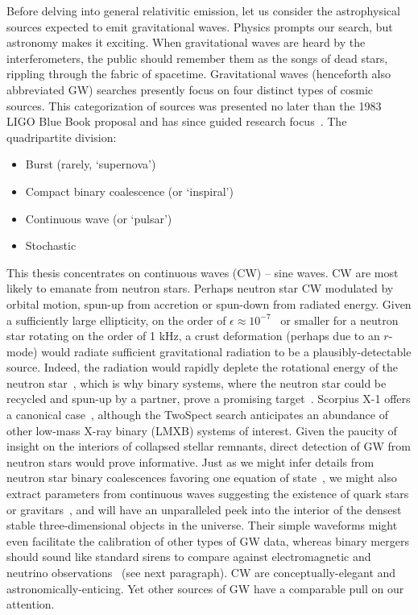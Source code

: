 Before delving into general relativitic emission, let us consider the astrophysical sources expected to emit gravitational waves. 
Physics prompts our search, but astronomy makes it exciting.
When gravitational waves are heard by the interferometers, the public should remember them as the songs of dead stars, rippling through the fabric of spacetime.  
Gravitational waves (henceforth also abbreviated GW) searches presently focus on four distinct types of cosmic sources.
This categorization of sources was presented no later than the 1983 LIGO Blue Book proposal and has since guided research focus~\cite{CollinsGravityShadow,Schutz1989}. 
The quadripartite division:
\begin{itemize}
\item Burst (rarely, `supernova')
\item Compact binary coalescence (or `inspiral')
\item Continuous wave (or `pulsar')
\item Stochastic
\end{itemize}

This thesis concentrates on continuous waves (CW) -- sine waves. 
CW are most likely to emanate from neutron stars. 
Perhaps neutron star CW modulated by orbital motion, spun-up from accretion or spun-down from radiated energy. 
Given a sufficiently large ellipticity, on the order of $\epsilon \approx 10^{-7}$~\cite{Owen2005} or smaller for a neutron star rotating on the order of 1 kHz, a crust deformation (perhaps due to an $r$-mode) would radiate sufficient gravitational radiation to be a plausibly-detectable source. 
Indeed, the radiation would rapidly deplete the rotational energy of the neutron star~\cite{Owen1998}, which is why binary systems, where the neutron star could be recycled and spun-up by a partner, prove a promising target~\cite{PapaloizouPringle1978,Wagoner1984}. 
Scorpius X-1 offers a canonical case~\cite{AbbottScoX12007}, although the TwoSpect search anticipates an abundance of other low-mass X-ray binary (LMXB) systems of interest. 
Given the paucity of insight on the interiors of collapsed stellar remnants, direct detection of GW from neutron stars would prove informative. 
Just as we might infer details from neutron star binary coalescences favoring one equation of state~\cite{Lattimer2007,Read2009}, we might also extract parameters from continuous waves suggesting the existence of quark stars or gravitars~\cite{Owen2005}, and will have an unparalleled peek into the interior of the densest stable three-dimensional objects in the universe. 
Their simple waveforms might even facilitate the calibration of other types of GW data, whereas binary mergers should sound like standard sirens to compare against electromagnetic and neutrino observations~\cite{Punturo2010}
(see next paragraph).
CW are conceptually-elegant and astronomically-enticing.
Yet other sources of GW have a comparable pull on our attention. 

